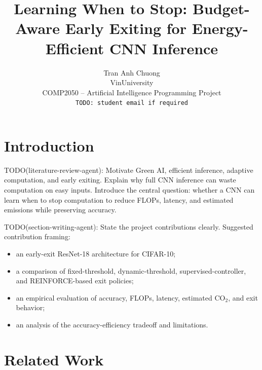 \documentclass[10pt,twocolumn]{article}
\title{\vspace{-1.0em}
Learning When to Stop: Budget-Aware Early Exiting for Energy-Efficient CNN Inference
\vspace{-0.4em}
}
\author{
Tran Anh Chuong\\
VinUniversity\\
COMP2050 -- Artificial Intelligence Programming Project\\
\texttt{TODO: student email if required}
}
\date{}
\newcommand{\dataset}{CIFAR-10}
\newcommand{\backbone}{ResNet-18}
\begin{document}

\section{Introduction}

TODO(literature-review-agent): Motivate Green AI, efficient inference, adaptive computation, and early exiting. Explain why full CNN inference can waste computation on easy inputs. Introduce the central question: whether a CNN can learn when to stop computation to reduce FLOPs, latency, and estimated emissions while preserving accuracy.

TODO(section-writing-agent): State the project contributions clearly. Suggested contribution framing:
\begin{itemize}
    \item an early-exit \backbone{} architecture for \dataset{};
    \item a comparison of fixed-threshold, dynamic-threshold, supervised-controller, and REINFORCE-based exit policies;
    \item an empirical evaluation of accuracy, FLOPs, latency, estimated CO$_2$, and exit behavior;
    \item an analysis of the accuracy-efficiency tradeoff and limitations.
\end{itemize}

\section{Related Work}
\end{document}
